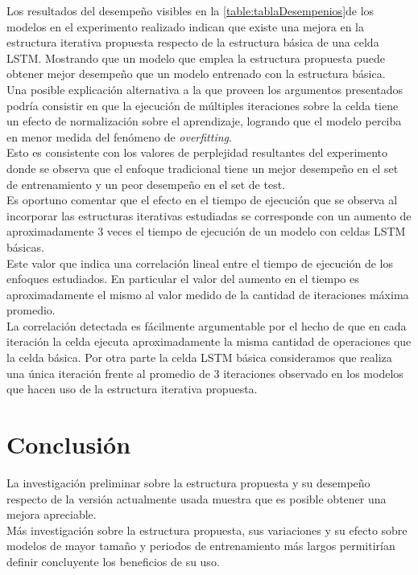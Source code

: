 \documentclass{article}
\begin{document}
Los resultados del desempeño visibles en la \ref{table:tablaDesempenios}de los modelos en el experimento realizado indican que existe una mejora en la estructura iterativa propuesta respecto de la estructura básica de una celda LSTM. Mostrando que un modelo que emplea la estructura propuesta puede obtener mejor desempeño que un modelo entrenado con la estructura básica.\\

Una posible explicación alternativa a la que proveen los argumentos presentados podría consistir en que la ejecución de múltiples iteraciones sobre la celda tiene un efecto de normalización sobre el aprendizaje, logrando que el modelo perciba en menor medida del fenómeno de \textit{overfitting}.\\

Esto es consistente con los valores de perplejidad resultantes del experimento donde se observa que el enfoque tradicional tiene un mejor desempeño en el set de entrenamiento y un peor desempeño en el set de test.\\

Es oportuno comentar que el efecto en el tiempo de ejecución que se observa al incorporar las estructuras iterativas estudiadas se corresponde con un aumento de aproximadamente 3 veces el tiempo de ejecución de un modelo con celdas LSTM básicas.\\

Este valor que indica una correlación lineal entre el tiempo de ejecución de los enfoques estudiados. En particular el valor del aumento en el tiempo es aproximadamente el mismo al valor medido de la cantidad de iteraciones máxima promedio.\\

La correlación detectada es fácilmente argumentable por el hecho de que en cada iteración la celda ejecuta aproximadamente la misma cantidad de operaciones que la celda básica. Por otra parte la celda LSTM básica consideramos que realiza una única iteración frente al promedio de 3 iteraciones observado en los modelos que hacen uso de la estructura iterativa propuesta.

\section{Conclusión}
La investigación preliminar sobre la estructura propuesta y su desempeño respecto de la versión actualmente usada muestra que es posible obtener una mejora apreciable.\\
Más investigación sobre la estructura propuesta, sus variaciones y su efecto sobre modelos de mayor tamaño y periodos de entrenamiento más largos permitirían definir concluyente los beneficios de su uso.
\end{document}
